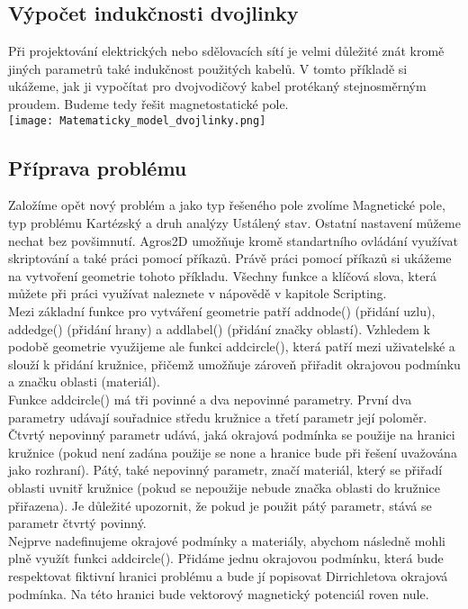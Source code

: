 \documentclass[a4paper, oneside]{article}
\begin{document}
\subsection{Výpočet indukčnosti dvojlinky}
\indent Při projektování elektrických nebo sdělovacích sítí je velmi důležité znát kromě jiných parametrů také indukčnost použitých kabelů. V tomto příkladě si ukážeme, jak ji vypočítat pro dvojvodičový kabel protékaný stejnosměrným proudem. Budeme tedy řešit magnetostatické pole.\\
\texttt{[image: Matematicky\_model\_dvojlinky.png]}\\
\subsection{Příprava problému}
\indent Založíme opět nový problém a jako typ řešeného pole zvolíme Magnetické pole, typ problému Kartézský a druh analýzy Ustálený stav. Ostatní nastavení můžeme nechat bez povšimnutí. Agros2D umožňuje kromě standartního ovládání využívat skriptování a také práci pomocí příkazů. Právě práci pomocí příkazů si ukážeme na vytvoření geometrie tohoto příkladu. Všechny funkce a klíčová slova, která můžete při práci využívat naleznete v nápovědě v kapitole Scripting.\\
\indent Mezi základní funkce pro vytváření geometrie patří addnode() (přidání uzlu), addedge() (přidání hrany) a addlabel() (přidání značky oblastí). Vzhledem k podobě geometrie využijeme ale funkci addcircle(), která patří mezi uživatelské a slouží k přidání kružnice, přičemž umožňuje zároveň přiřadit okrajovou podmínku a značku oblasti (materiál).\\
\indent Funkce addcircle() má tři povinné a dva nepovinné parametry. První dva parametry udávají souřadnice středu kružnice a třetí parametr její poloměr. Čtvrtý nepovinný parametr udává, jaká okrajová podmínka se použije na hranici kružnice (pokud není zadána použije se none a hranice bude při řešení uvažována jako rozhraní). Pátý, také nepovinný parametr, značí materiál, který se přiřadí oblasti uvnitř kružnice (pokud se nepoužije nebude značka oblasti do kružnice přiřazena). Je důležité upozornit, že pokud je použit pátý parametr, stává se parametr čtvrtý povinný.\\
\indent Nejprve nadefinujeme okrajové podmínky a materiály, abychom následně mohli plně využít funkci addcircle(). Přidáme jednu okrajovou podmínku, která bude respektovat fiktivní hranici problému a bude jí popisovat Dirrichletova okrajová podmínka. Na této hranici bude vektorový magnetický potenciál roven nule.\\
\end{document}
